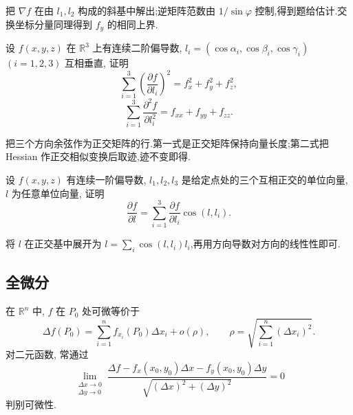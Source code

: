 \begin{solution}
    把 $\nabla f$ 在由 $l_1,l_2$ 构成的斜基中解出;逆矩阵范数由 $1/\sin\varphi$ 控制,得到题给估计.交换坐标分量同理得到 $f_y$ 的相同上界.
\end{solution}

\begin{example}
    设 $f(x,y,z)$ 在 $\mathbb{R}^3$ 上有连续二阶偏导数, $l_i=(\cos\alpha_i,\cos\beta_i,\cos\gamma_i)$ $(i=1,2,3)$ 互相垂直, 证明
    \[
        \sum\limits_{i=1}^3\left(\dfrac{\partial f}{\partial l_i}\right)^2
        =f_x^2+f_y^2+f_z^2,
    \]
    \[
        \sum\limits_{i=1}^3\dfrac{\partial^2f}{\partial l_i^2}
        =f_{xx}+f_{yy}+f_{zz}.
    \]
\end{example}
\exampleblank

\begin{solution}
    把三个方向余弦作为正交矩阵的行.第一式是正交矩阵保持向量长度;第二式把 Hessian 作正交相似变换后取迹,迹不变即得.
\end{solution}

\begin{example}[\markstar]
    设 $f(x,y,z)$ 有连续一阶偏导数, $l_1,l_2,l_3$ 是给定点处的三个互相正交的单位向量, $l$ 为任意单位向量, 证明
    \[
        \dfrac{\partial f}{\partial l}
        =\sum\limits_{i=1}^3\dfrac{\partial f}{\partial l_i}\cos(l,l_i).
    \]
\end{example}
\exampleblank

\begin{solution}
    将 $l$ 在正交基中展开为 $l=\sum_i\cos(l,l_i)l_i$,再用方向导数对方向的线性性即可.
\end{solution}



\subsection{全微分}

在 $\mathbb{R}^n$ 中, $f$ 在 $P_0$ 处可微等价于
\[
    \Delta f(P_0)=\sum\limits_{i=1}^n f_{x_i}(P_0)\Delta x_i+o(\rho),
    \qquad
    \rho=\sqrt{\sum\limits_{i=1}^n(\Delta x_i)^2}.
\]
对二元函数, 常通过
\[
    \lim\limits_{\substack{\Delta x\to0\\\Delta y\to0}}
    \dfrac{\Delta f-f_x(x_0,y_0)\Delta x-f_y(x_0,y_0)\Delta y}
    {\sqrt{(\Delta x)^2+(\Delta y)^2}}=0
\]
判别可微性.

